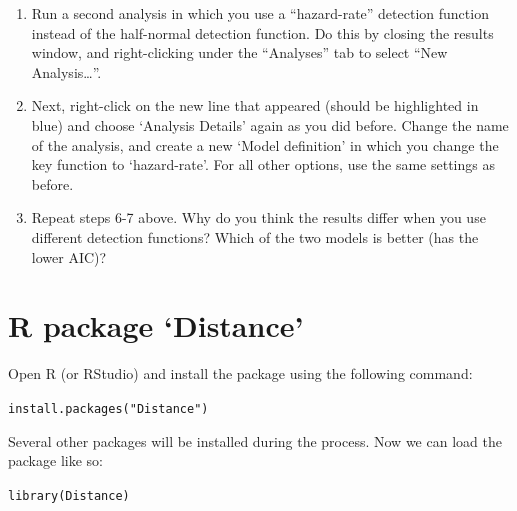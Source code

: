 \documentclass[12pt]{article}\usepackage[]{graphicx}\usepackage[]{color}
\makeatletter
\newcommand{\hlstr}[1]{\textcolor[rgb]{0.749,0.012,0.012}{#1}}%
\newcommand{\hlstd}[1]{\textcolor[rgb]{0,0,0}{#1}}%
\newcommand{\hlkwd}[1]{\textcolor[rgb]{0.004,0.004,0.506}{#1}}%
\newenvironment{kframe}{%
 \def\at@end@of@kframe{}%
 \ifinner\ifhmode%
  \def\at@end@of@kframe{\end{minipage}}%
  \begin{minipage}{\columnwidth}%
 \fi\fi%
 \def\FrameCommand##1{\hskip\@totalleftmargin \hskip-\fboxsep
 \colorbox{shadecolor}{##1}\hskip-\fboxsep
     \hskip-\linewidth \hskip-\@totalleftmargin \hskip\columnwidth}%
 \MakeFramed {\advance\hsize-\width
   \@totalleftmargin\z@ \linewidth\hsize
   \@setminipage}}%
 {\par\unskip\endMakeFramed%
 \at@end@of@kframe}
\newenvironment{knitrout}{}{} %
\makeatother
\begin{document}
\begin{enumerate}
  \item Run a second analysis in which you use a ``hazard-rate''
    detection function instead of the half-normal detection
    function. Do this by closing the results window, and
    right-clicking under the ``Analyses'' tab to select ``New Analysis\dots''.  
  \item Next, right-click on the new line that appeared (should be
    highlighted in blue) and choose `Analysis Details' again as you
    did before. Change the name of the analysis, and create a new
    `Model definition' in which you change the key function to
    `hazard-rate'. For all other options, use the same settings as
    before.   
  \item Repeat steps 6-7 above. Why do you think the results differ
    when you use different detection functions? Which of the two
    models is better (has the lower AIC)?  
\end{enumerate}


\clearpage


\section*{R package `Distance'}

Open R (or RStudio) and install the package using the following
command: 

\begin{knitrout}
\color{fgcolor}\begin{kframe}
\begin{alltt}
\hlkwd{install.packages}\hlstd{(}\hlstr{"Distance"}\hlstd{)}
\end{alltt}
\end{kframe}
\end{knitrout}

Several other packages will be installed during the process. Now we
can load the package like so: 

\begin{knitrout}
\color{fgcolor}\begin{kframe}
\begin{alltt}
\hlkwd{library}\hlstd{(Distance)}
\end{alltt}


{\ttfamily\noindent\itshape\color{messagecolor}{\#\# Loading required package: mrds}}

{\ttfamily\noindent\itshape\color{messagecolor}{\#\# This is mrds 2.2.5\\\#\# Built: R 4.1.0; ; 2021-10-31 14:39:18 UTC; unix}}

{\ttfamily\noindent\itshape\color{messagecolor}{\#\# \\\#\# Attaching package: 'Distance'}}

{\ttfamily\noindent\itshape\color{messagecolor}{\#\# The following object is masked from 'package:mrds':\\\#\# \\\#\# \ \ \ \ create.bins}}\end{kframe}
\end{knitrout}
\end{document}
